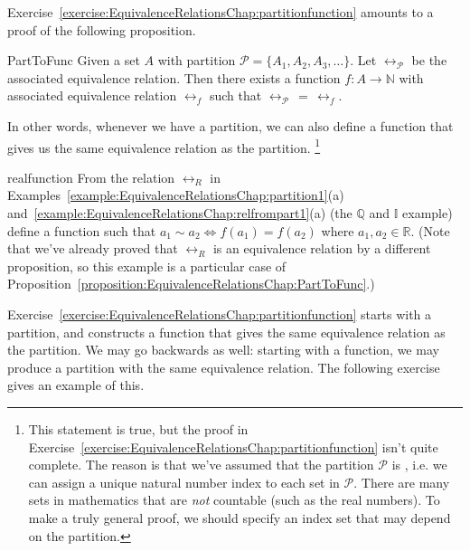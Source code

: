 Exercise~\ref{exercise:EquivalenceRelationsChap:partitionfunction} amounts to a proof of the following proposition.     

\begin{prop}{PartToFunc}
Given a set $A$ with partition $\mathcal{P}=\{A_1, A_2, A_3, \ldots \}$. 
Let $\rel_{\mathcal{P}}$ be the associated equivalence relation. 
Then there exists a function $f:A \rightarrow \mathbb{N}$ with associated equivalence relation $\rel_f$ such that 
$\rel_{\mathcal{P}} \, = \, \rel_{f}$.
\end{prop}

In other words, whenever we have a partition, we can also define a function that gives us the same equivalence relation as the partition.
\footnote{This statement is true, but the proof in Exercise~\ref{exercise:EquivalenceRelationsChap:partitionfunction} isn't quite complete. The reason is that we've assumed that the partition $\mathcal{P}$ is , i.e. we can assign a unique natural number index to each set in $\mathcal{P}$. There are many sets in mathematics that are \emph{not} countable (such as the real numbers). To make a truly general proof, we should specify an index set that may depend on the partition.}


\begin{exercise}{realfunction}
From the relation $\rel_R$ in Examples~\ref{example:EquivalenceRelationsChap:partition1}(a) and~\ref{example:EquivalenceRelationsChap:relfrompart1}(a) (the $\mathbb{Q}$ and  $\mathbb{I}$ example) define a function such that $a_1 \sim a_2 \iff  f(a_1) = f(a_2)$ where $a_1, a_2 \in \mathbb{R}$.  (Note that we've already proved that $\rel_R$ is an equivalence relation by a different proposition, so this example is a particular case of Proposition~\ref{proposition:EquivalenceRelationsChap:PartToFunc}.) 
\end{exercise}

Exercise~\ref{exercise:EquivalenceRelationsChap:partitionfunction} starts with a partition, and constructs a function that gives the same equivalence relation as the partition.  We may go backwards as well: starting with a function, we may produce a partition with the same equivalence relation. The following exercise gives an example of this.

